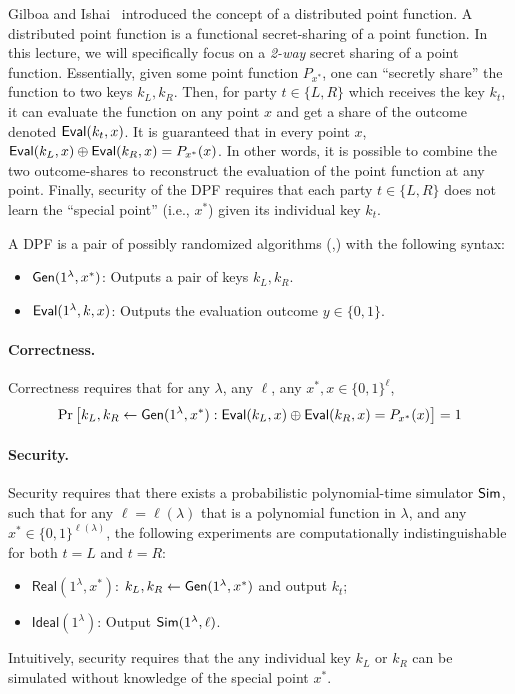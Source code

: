 Gilboa and Ishai~\cite{dpf} introduced the concept of a distributed point function. 
A distributed point function
is a functional secret-sharing of a point function.
In this lecture, 
we will specifically focus on a {\it 2-way} secret sharing of a point function.
Essentially, given some point function $P_{x^*}$, 
one can ``secretly share'' the function to two keys $k_L,k_R$. 
Then, for party $t \in \{L, R\}$ which
receives the key $k_t$, 
it can evaluate the function on any point $x$ and 
get a share of the outcome denoted ${\sf Eval}(k_t, x)$. 
It is guaranteed that in every point $x$, 
${\sf Eval}(k_L, x)\oplus{\sf Eval}(k_R, x)=P_{x^*}(x)$.
In other words, it is possible to combine
the two outcome-shares to reconstruct the  
evaluation of the point function at any point. 
Finally, security of the DPF requires that  
each party $t \in \{L, R\}$ does not learn  
the ``special point'' (i.e., $x^*$) given its individual key $k_t$.


\begin{definition}
    A DPF is a pair of possibly randomized 
algorithms (\Gen,\Eval) with the following syntax:
    \hfill
    \begin{itemize}
        \item ${\sf Gen}(1^\lambda,x^*)$: Outputs a pair of keys $k_L,k_R$.
        \item ${\sf Eval}(1^\lambda, k,x)$: Outputs the evaluation outcome $y \in \{0,1\}$.
    \end{itemize}
    \paragraph{Correctness.} 
Correctness requires that for any $\lambda$, 
any $\ell$, 
any $x^*, x \in \{0, 1\}^{\ell}$, 
\[
\Pr\left[k_L,k_R \leftarrow {\sf Gen}(1^\lambda, x^*):{\sf Eval}(k_L,x) \oplus {\sf Eval}(k_R,x) = P_{x^*}(x)\right] = 1
\]


\paragraph{Security.} 
Security requires that 
there exists a probabilistic polynomial-time simulator ${\sf Sim}$, 
such that 
for any $\ell = \ell(\lambda)$ that is a polynomial function in $\lambda$, 
and any $x^*\in \{0,1\}^{\ell(\lambda)}$, 
the following experiments are computationally indistinguishable
for both $t  = L$ and $t = R$: 
    \begin{itemize}
        \item $\mathsf{Real}(1^\lambda, x^*)$: $k_L,k_R\leftarrow  {\sf Gen}(1^\lambda, x^*)$ and output $k_t$;
        \item $\mathsf{Ideal}(1^\lambda)$: Output ${\sf Sim}(1^\lambda, \ell)$.
    \end{itemize}
\end{definition}
Intuitively, security requires that the any individual 
key $k_L$ or $k_R$ 
can be simulated without knowledge
of the special point $x^*$.

